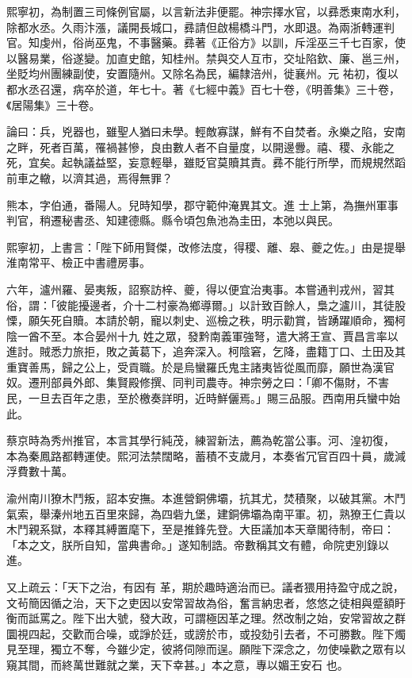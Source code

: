 \begin{pinyinscope}
 熙寧初，為制置三司條例官屬，以言新法非便罷。神宗擇水官，以彞悉東南水利，除都水丞。久雨汴漲，議開長城口，彞請但啟楊橋斗門，水即退。為兩浙轉運判官。知虔州，俗尚巫鬼，不事醫藥。彞著《正俗方》以訓，斥淫巫三千七百家，使以醫易業，俗遂變。加直史館，知桂州。禁與交人互市，交址陷欽、廉、邕三州，坐貶均州團練副使，安置隨州。又除名為民，編隸涪州，徙襄州。元
 祐初，復以都水丞召還，病卒於道，年七十。著《七經中義》百七十卷，《明善集》三十卷，《居陽集》三十卷。



 論曰：兵，兇器也，雖聖人猶曰未學。輕敵寡謀，鮮有不自焚者。永樂之陷，安南之畔，死者百萬，罹禍甚慘，良由數人者不自量度，以開邊釁。禧、稷、永能之死，宜矣。起執議益堅，妄意輕舉，雖貶官莫贖其責。彞不能行所學，而規規然蹈前車之轍，以濟其過，焉得無罪？



 熊本，字伯通，番陽人。兒時知學，郡守範仲淹異其文。進
 士上第，為撫州軍事判官，稍遷秘書丞、知建德縣。縣令頃包魚池為圭田，本弛以與民。



 熙寧初，上書言：「陛下師用賢傑，改修法度，得稷、離、皋、夔之佐。」由是提舉淮南常平、檢正中書禮房事。



 六年，瀘州羅、晏夷叛，詔察訪梓、夔，得以便宜治夷事。本嘗通判戎州，習其俗，謂：「彼能擾邊者，介十二村豪為鄉導爾。」以計致百餘人，梟之瀘川，其徒股慄，願矢死自贖。本請於朝，寵以刺史、巡檢之秩，明示勸賞，皆踴躍順命，獨柯陰一酋不至。本合晏州十九
 姓之眾，發黔南義軍強弩，遣大將王宣、賈昌言率以進討。賊悉力旅拒，敗之黃葛下，追奔深入。柯陰窘，乞降，盡籍丁口、土田及其重寶善馬，歸之公上，受貢職。於是烏蠻羅氏鬼主諸夷皆從風而靡，願世為漢官奴。遷刑部員外郎、集賢殿修撰、同判司農寺。神宗勞之曰：「卿不傷財，不害民，一旦去百年之患，至於檄奏詳明，近時鮮儷焉。」賜三品服。西南用兵蠻中始此。



 蔡京時為秀州推官，本言其學行純茂，練習新法，薦為乾當公事。河、湟初復，
 本為秦鳳路都轉運使。熙河法禁闊略，蓄積不支歲月，本奏省冗官百四十員，歲減浮費數十萬。



 渝州南川獠木鬥叛，詔本安撫。本進營銅佛壩，抗其尤，焚積聚，以破其黨。木鬥氣索，舉溱州地五百里來歸，為四砦九堡，建銅佛壩為南平軍。初，熟獠王仁貴以木鬥親系獄，本釋其縛置麾下，至是推鋒先登。大臣議加本天章閣待制，帝曰：「本之文，朕所自知，當典書命。」遂知制誥。帝數稱其文有體，命院吏別錄以進。



 又上疏云：「天下之治，有因有
 革，期於趣時適治而已。議者猥用持盈守成之說，文茍簡因循之治，天下之吏因以安常習故為俗，奮言納忠者，悠悠之徒相與蹙額盱衡而詆罵之。陛下出大號，發大政，可謂極因革之理。然改制之始，安常習故之群圜視四起，交歡而合噪，或諍於廷，或謗於市，或投劾引去者，不可勝數。陛下燭見至理，獨立不奪，今雖少定，彼將伺隙而逞。願陛下深念之，勿使噪歡之眾有以窺其間，而終萬世難就之業，天下幸甚。」本之意，專以媚王安石
 也。




\end{pinyinscope}
